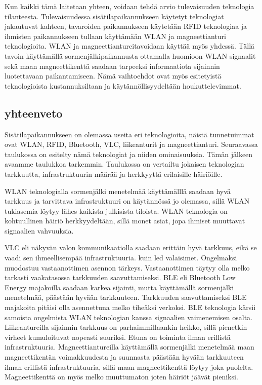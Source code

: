 Kun kaikki tämä laitetaan yhteen, voidaan tehdä arvio tulevaisuuden teknologia tilanteesta. Tulevaisuudessa sisätilapaikannukseen käytetyt teknologiat jakautuvat kahteen, tavaroiden paikannukseen käytetään RFID teknologiaa ja ihmisten paikannukseen tullaan käyttämään WLAN ja magneettianturi teknologioita. WLAN ja magneettiantureitavoidaan käyttää myös yhdessä\cite{atlas}. Tällä tavoin käyttämällä sormenjälkipaikannusta ottamalla huomioon WLAN signaalit sekä maan magneettikenttä saadaan tarpeeksi informaatiota sijainnin luotettavaan paikantamiseen. Nämä vaihtoehdot ovat myös esitetyistä teknologioista kustannuksiltaan ja käytännöllisyydeltään houkuttelevimmat.
%
\subsection{yhteenveto}

Sisätilapaikannukseen on olemassa useita eri teknologioita, näistä tunnetuimmat ovat WLAN, RFID, Bluetooth, VLC, liikeanturit ja magneettianturi. Seuraavassa taulukossa on esitelty nämä teknologiat ja niiden ominaisuuksia. Tämän jälkeen avaamme taulukkoa tarkemmin. Taulukossa on vertailtu jokaisen teknologian tarkkuutta, infrastruktuurin määrää ja herkkyyttä erilaisille häiriöille.

WLAN teknologialla sormenjälki menetelmää käyttämälllä saadaan hyvä tarkkuus ja tarvittava infrastruktuuri on käytännössä jo olemassa, sillä WLAN tukiasemia löytyy lähes kaikista julkisista tiloista. WLAN teknologia on kohtuullinen häiriö herkkyydeltään, sillä monet asiat, jopa ihmiset muuttavat signaalien vahvuuksia.

VLC eli näkyvän valon kommunikaatiolla saadaan erittäin hyvä tarkkuus, eikä se vaadi sen ihmeellisempää infrastruktuuria. kuin led valaisimet. Ongelmaksi muodostuu vastaanottimen asennon tärkeys. Vastaanottimen täytyy olla melko tarkasti vaakatasossa tarkkuuden saavuttamiseksi.
BLE eli Bluetooth Low Energy majakoilla saadaan karkea sijainti, mutta käyttämällä sormenjälki menetelmää, päästään hyvään tarkkuuteen. Tarkkuuden saavuttamiseksi BLE majakoita pitäisi olla asennettuna melko tiheäksi verkoksi. BLE teknologia kärsii samoista ongelmista WLAN teknologian kanssa signaalien vaimenemisen osalta.
Liikeantureilla sijainnin tarkkuus on parhaimmillaankin heikko, sillä pienetkin virheet kumuloituvat nopeasti suuriksi. Etuna on toiminta ilman erillistä infrastruktuuria.
Magneettiantureilla käyttämällä sormenjälki menetelmää maan magneettikentän voimakkuudesta ja suunnasta päästään hyvään tarkkuuteen ilman erillistä infrastruktuuria, sillä maan magneettikenttä löytyy joka puolelta. Magneettikenttä on myös melko muuttumaton joten häiriöt jäävät pieniksi. 


